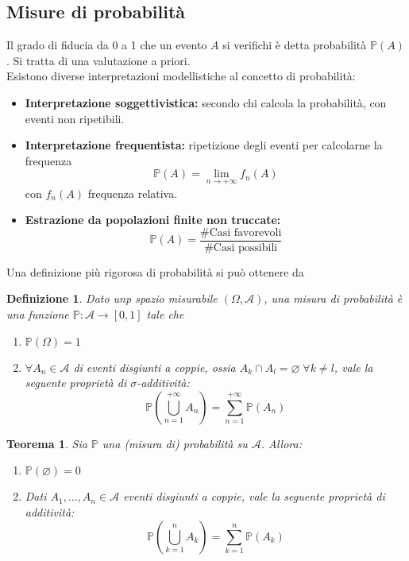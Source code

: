 \documentclass[a4paper,12pt]{article}
\theoremstyle{break}
\newtheorem{theorem}{Teorema}[section]
\newtheorem{definition}{Definizione}[section]
\let\emptyset\varnothing
\numberwithin{equation}{section}
\begin{document}
\subsection{Misure di probabilità}
Il grado di fiducia da 0 a 1 che un evento \(A\) si verifichi è detta probabilità \(\mathbb{P}(A)\). Si tratta di una valutazione a priori. \\
Esistono diverse interpretazioni modellistiche al concetto di probabilità:
\begin{itemize}
  \item \textbf{Interpretazione soggettivistica:} secondo chi calcola la probabilità, con eventi non ripetibili.
  \item \textbf{Interpretazione frequentista:} ripetizione degli eventi per calcolarne la frequenza
  \[
    \mathbb{P}(A) = \lim_{n\rightarrow + \infty} f_n(A)
  \]
  con \(f_n(A)\) frequenza relativa.
  \item \textbf{Estrazione da popolazioni finite non truccate:} 
  \[
    \mathbb{P}(A) = \frac{\text{\#Casi favorevoli}}{\text{\#Casi possibili}}
  \]
\end{itemize}
Una definizione più rigorosa di probabilità si può ottenere da
\begin{definition}
  Dato unp spazio misurabile \((\Omega, \mathcal{A})\), una misura di probabilità è una funzione \(\mathbb{P} : \mathcal{A} \rightarrow [0,1]\) tale che
  \begin{enumerate}
    \item \(\mathbb{P}(\Omega) = 1\)
    \item \(\forall A_n \in \mathcal{A}\) di eventi disgiunti a coppie, ossia \(A_k \cap A_l = \emptyset \; \forall k \not = l\), vale la seguente proprietà di \(\sigma\)-additività:
    \[
      \mathbb{P}\left(\bigcup_{n=1}^{+\infty}A_n\right) = \sum_{n=1}^{+\infty} \mathbb{P}(A_n)
    \]
  \end{enumerate}
\end{definition}
\begin{theorem}
  Sia \(\mathbb{P}\) una (misura di) probabilità su \(\mathcal{A}\). Allora:
  \begin{enumerate}
    \item \(\mathbb{P}(\emptyset) = 0\)
    \item Dati \(A_1, \ldots, A_n \in \mathcal{A}\) eventi disgiunti a coppie, vale la seguente proprietà di additività:
    \[
      \mathbb{P}\left(\bigcup_{k=1}^n A_k\right) = \sum_{k=1}^n \mathbb{P}(A_k)
    \]
  \end{enumerate}
\end{theorem}
\end{document}

